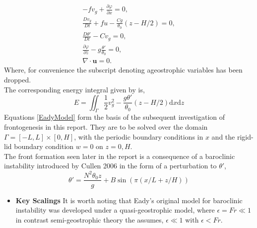\begin{equation}
	\begin{aligned}
		-fv_g + \frac{\partial \varphi}{\partial x} = 0,\\
		\frac{Dv_g}{Dt} + fu -\frac{Cg}{\theta _0}\left(z-H/2\right) = 0,\\
		\frac{D\theta'}{Dt} - Cv_g = 0,\\
		\frac{\partial \varphi}{\partial z} - g\frac{\theta'}{\theta_0} = 0,\\
		\nabla \cdot \bm{u} = 0.
	\end{aligned}
\label{EadyModel}
\end{equation}
Where, for convenience the subscript denoting ageostrophic variables has been dropped. \\
\linebreak
The corresponding energy integral given by \cite{Cullen2006a} is,
\begin{equation}
	E = \iint_{\Gamma} \frac{1}{2}v_g^2 - \frac{g\theta'}{\theta_0}\left(z - H/2\right)\textrm{d}x\textrm{d}z
\end{equation}
Equations \ref{EadyModel} form the basis of the subsequent investigation of frontogenesis in this report. They are to be solved over the domain $\Gamma = [-L,L] \times [0,H]$, with the periodic boundary conditions in $x$ and the rigid-lid boundary condition $w = 0$ on $z = 0,H$. \\
\linebreak
The front formation seen later in the report is a consequence of a baroclinic instability introduced by Cullen 2006 \cite{Cullen2006a} in the form of a perturbation to $\theta'$, 
\begin{equation}
	\theta' = \frac{N^2\theta_0 z}{g} + B\sin\left(\pi\left(x/L + z/H\right)\right)
\label{thetap}
\end{equation}
\begin{itemize}
	\item \textbf{Key Scalings}
	It is worth noting that Eady's original model for baroclinic instability was developed under a quasi-geostrophic model, where $\epsilon = Fr \ll 1$ in contrast semi-geostrophic theory the assumes, $\epsilon \ll 1$ with $\epsilon < Fr$.
\end{itemize}
